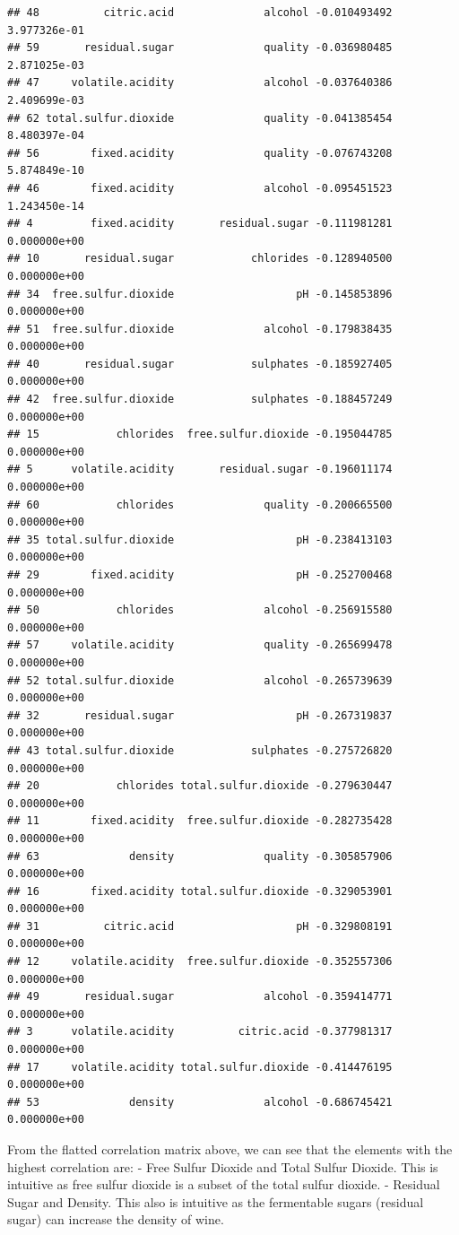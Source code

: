 \documentclass[
]{book}
\begin{document}
\begin{verbatim}
## 48          citric.acid              alcohol -0.010493492 3.977326e-01
## 59       residual.sugar              quality -0.036980485 2.871025e-03
## 47     volatile.acidity              alcohol -0.037640386 2.409699e-03
## 62 total.sulfur.dioxide              quality -0.041385454 8.480397e-04
## 56        fixed.acidity              quality -0.076743208 5.874849e-10
## 46        fixed.acidity              alcohol -0.095451523 1.243450e-14
## 4         fixed.acidity       residual.sugar -0.111981281 0.000000e+00
## 10       residual.sugar            chlorides -0.128940500 0.000000e+00
## 34  free.sulfur.dioxide                   pH -0.145853896 0.000000e+00
## 51  free.sulfur.dioxide              alcohol -0.179838435 0.000000e+00
## 40       residual.sugar            sulphates -0.185927405 0.000000e+00
## 42  free.sulfur.dioxide            sulphates -0.188457249 0.000000e+00
## 15            chlorides  free.sulfur.dioxide -0.195044785 0.000000e+00
## 5      volatile.acidity       residual.sugar -0.196011174 0.000000e+00
## 60            chlorides              quality -0.200665500 0.000000e+00
## 35 total.sulfur.dioxide                   pH -0.238413103 0.000000e+00
## 29        fixed.acidity                   pH -0.252700468 0.000000e+00
## 50            chlorides              alcohol -0.256915580 0.000000e+00
## 57     volatile.acidity              quality -0.265699478 0.000000e+00
## 52 total.sulfur.dioxide              alcohol -0.265739639 0.000000e+00
## 32       residual.sugar                   pH -0.267319837 0.000000e+00
## 43 total.sulfur.dioxide            sulphates -0.275726820 0.000000e+00
## 20            chlorides total.sulfur.dioxide -0.279630447 0.000000e+00
## 11        fixed.acidity  free.sulfur.dioxide -0.282735428 0.000000e+00
## 63              density              quality -0.305857906 0.000000e+00
## 16        fixed.acidity total.sulfur.dioxide -0.329053901 0.000000e+00
## 31          citric.acid                   pH -0.329808191 0.000000e+00
## 12     volatile.acidity  free.sulfur.dioxide -0.352557306 0.000000e+00
## 49       residual.sugar              alcohol -0.359414771 0.000000e+00
## 3      volatile.acidity          citric.acid -0.377981317 0.000000e+00
## 17     volatile.acidity total.sulfur.dioxide -0.414476195 0.000000e+00
## 53              density              alcohol -0.686745421 0.000000e+00
\end{verbatim}

From the flatted correlation matrix above, we can see that the elements with the highest correlation are:
- Free Sulfur Dioxide and Total Sulfur Dioxide. This is intuitive as free sulfur dioxide is a subset of the total sulfur dioxide.
- Residual Sugar and Density. This also is intuitive as the fermentable sugars (residual sugar) can increase the density of wine.
\end{document}
